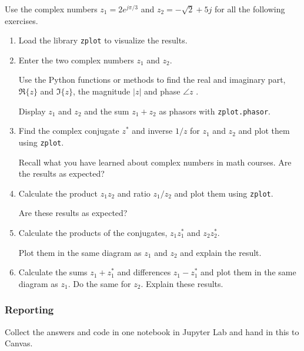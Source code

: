 Use the complex numbers $z_1 = 2e^{j\pi/3}$ and $z_2= -\sqrt{2} + 5j$ for all the following exercises.

\begin{enumerate}[1)]
	\item Load the library \verb|zplot| to visualize the results.

	\item Enter the two complex numbers $z_1$ and $z_2$. 
	
		Use the Python functions or methods to find the real and imaginary part, $\Re\{z\}$ and $\Im\{z\}$, the magnitude $|z|$ and phase $\angle z$ .
	
		Display $z_1$ and $z_2$ and the sum $z_1+z_2$ as phasors with \verb|zplot.phasor|.

	\item Find the complex conjugate $z^*$ and inverse $1/z$ for $z_1$ and $z_2$ and plot them using \verb|zplot|.
	
		Recall what you have learned about complex numbers in math courses. Are the results as expected?
			
	\item Calculate the product $z_1 z_2$ and ratio $z_1/z_2$ and plot them using \verb|zplot|. 
	
		Are these results as expected?

	\item Calculate the products of the conjugates, $z_1 z_1^*$ and $z_2 z_2^*$. 
	
	Plot them in the same diagram as $z_1$ and $z_2$ and explain the result.

	\item Calculate the sums $z_1+z_1^*$ and differences $z_1-z_1^*$ and plot them in the same diagram as $z_1$. Do the same for $z_2$. Explain these results.
		
\end{enumerate}

\subsubsection*{Reporting}	
Collect the answers and code in one notebook in Jupyter Lab and hand in this to Canvas.
		
		
